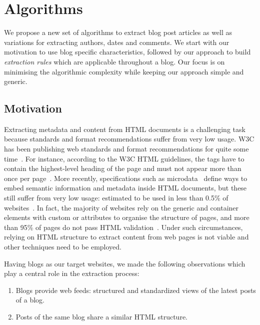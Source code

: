 ﻿\section{Algorithms}
\label{algorithms}
We propose a new set of algorithms to extract blog post articles as well 
as variations for extracting authors, dates and comments. We start with 
our motivation to use blog specific characteristics, followed by our 
approach to build \emph{extraction rules} which are applicable throughout 
a blog. Our focus is on minimising the algorithmic complexity while 
keeping our approach simple and generic.

\subsection{Motivation}
\label{motivation}

Extracting metadata and content from HTML documents is a challenging task 
because standards and format recommendations suffer from very low usage. 
W3C has been publishing web standards and format recommendations for 
quite some time~\cite{w3c2014}. For instance, according to the W3C 
HTML guidelines, the  tags have to contain the 
highest-level heading of the page and must not appear more than 
once per page~\cite{w3c2002}. More recently, specifications such 
as microdata~\cite{whatwg2014} define ways to embed semantic information 
and metadata inside HTML documents, but these still suffer from 
very low usage: estimated to be used in less than 0.5\% of 
websites~\cite{andrewrogers2014}. In fact, the majority of websites rely 
on the generic  and  container 
elements with custom  or  attributes to organise 
the structure of pages, and more than 95\% of pages do not pass HTML 
validation~\cite{brianwilson2008}. Under such circumstances, relying 
on HTML structure to extract content from web pages is not viable and 
other techniques need to be employed.

Having blogs as our target websites, we made the following observations 
which play a central role in the extraction process:

\begin{enumerate}
\item\label{havefeedAssum} 
Blogs provide web feeds: structured and standardized views of the latest 
posts of a blog.
\item\label{similarhtmlAssum} 
Posts of the same blog share a similar HTML structure.
\end{enumerate}

